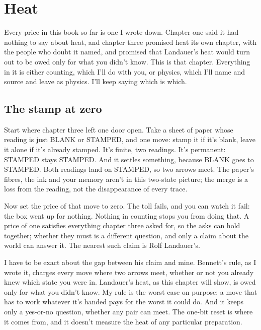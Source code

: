 \documentclass[11pt,twoside]{article}
\theoremstyle{thielethm}
\theoremstyle{thieledef}
\theoremstyle{thieledef}
\theoremstyle{thieledef}
\theoremstyle{thielethm}
\theoremstyle{thieleobs}
\theoremstyle{thielethm}
\begin{document}
\section{Heat}
\label{sec:heat}

Every price in this book so far is one I wrote down. Chapter one said it had nothing to say about heat, and chapter three promised heat its own chapter, with the people who doubt it named, and promised that Landauer's heat would turn out to be owed only for what you didn't know. This is that chapter. Everything in it is either counting, which I'll do with you, or physics, which I'll name and source and leave as physics. I'll keep saying which is which.

\subsection{The stamp at zero}

Start where chapter three left one door open. Take a sheet of paper whose reading is just BLANK or STAMPED, and one move: stamp it if it's blank, leave it alone if it's already stamped. It's finite, two readings. It's permanent: STAMPED stays STAMPED. And it settles something, because BLANK goes to STAMPED. Both readings land on STAMPED, so two arrows meet. The paper's fibres, the ink and your memory aren't in this two-state picture; the merge is a loss from the reading, not the disappearance of every trace.

Now set the price of that move to zero. The toll fails, and you can watch it fail: the box went up for nothing. Nothing in counting stops you from doing that. A price of one satisfies everything chapter three asked for, so the asks can hold together; whether they must is a different question, and only a claim about the world can answer it. The nearest such claim is Rolf Landauer's.

I have to be exact about the gap between his claim and mine. Bennett's rule, as I wrote it, charges every move where two arrows meet, whether or not you already knew which state you were in. Landauer's heat, as this chapter will show, is owed only for what you didn't know. My rule is the worst case on purpose: a move that has to work whatever it's handed pays for the worst it could do. And it keeps only a yes-or-no question, whether any pair can meet. The one-bit reset is where it comes from, and it doesn't measure the heat of any particular preparation.
\end{document}
